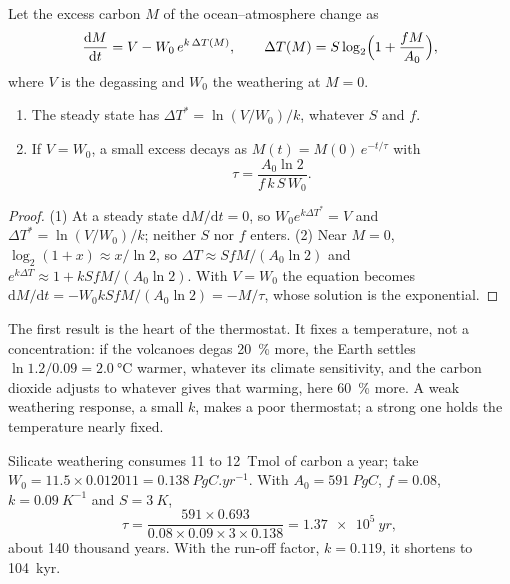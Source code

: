 \begin{proposition}\label{prop:b2:deep-time-climate:thermostat}
Let the excess carbon $M$ of the ocean--atmosphere change as
\[
  \frac{\mathrm dM}{\mathrm dt} = V - W_0\,e^{k\,\Delta T(M)}, \qquad
  \Delta T(M) = S\log_2\Bigl(1 + \frac{fM}{A_0}\Bigr),
\]
where $V$ is the degassing and $W_0$ the weathering at $M = 0$.
\begin{enumerate}
  \item The steady state has $\Delta T^* = \ln(V/W_0)/k$, whatever $S$ and $f$.
  \item If $V = W_0$, a small excess decays as $M(t) = M(0)\,e^{-t/\tau}$ with
        \[
          \tau = \frac{A_0 \ln 2}{f\,k\,S\,W_0} .
        \]
\end{enumerate}
\end{proposition}

\begin{proof}
(1) At a steady state $\mathrm dM/\mathrm dt = 0$, so $W_0e^{k\Delta T^*} = V$ and $\Delta T^* =
\ln(V/W_0)/k$; neither $S$ nor $f$ enters. (2) Near $M = 0$, $\log_2(1 + x) \approx x/\ln 2$, so
$\Delta T \approx SfM/(A_0\ln 2)$ and $e^{k\Delta T} \approx 1 + kSfM/(A_0\ln2)$. With $V = W_0$ the
equation becomes $\mathrm dM/\mathrm dt = -W_0kSfM/(A_0\ln 2) = -M/\tau$, whose solution is the
exponential.
\end{proof}

The first result is the heart of the thermostat. It fixes a temperature, not a concentration: if
the volcanoes degas \qty{20}{\percent} more, the Earth settles $\ln 1.2/0.09 = \qty{2.0}{\celsius}$
warmer, whatever its climate sensitivity, and the carbon dioxide adjusts to whatever gives that
warming, here \qty{60}{\percent} more. A weak weathering response, a small $k$, makes a poor
thermostat; a strong one holds the temperature nearly fixed.

\begin{example}\label{ex:b2:deep-time-climate:tau}
Silicate weathering consumes 11 to \qty{12}{Tmol} of carbon a year; take $W_0 = 11.5\times0.012011
= \qty{0.138}{PgC.yr^{-1}}$. With $A_0 = \qty{591}{PgC}$, $f = 0.08$, $k = \qty{0.09}{K^{-1}}$ and
$S = \qty{3}{K}$,
\[
  \tau = \frac{591\times0.693}{0.08\times0.09\times3\times0.138} = \qty{1.37e5}{yr} ,
\]
about 140 thousand years. With the run-off factor, $k = 0.119$, it shortens to
\qty{104}{kyr}.
\end{example}

